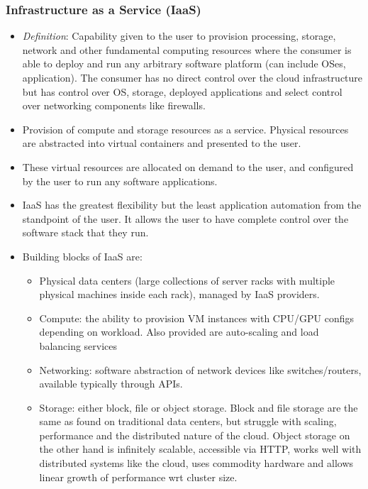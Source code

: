 \documentclass{article}
\begin{document}
\subsubsection{Infrastructure as a Service (IaaS)}
\begin{itemize}
    \item \textit{Definition}: Capability given to the user to provision processing, storage, network and other fundamental computing resources where the consumer is able to deploy and run any arbitrary software platform (can include OSes, application). The consumer has no direct control over the cloud infrastructure but has control over OS, storage, deployed applications and select control over networking components like firewalls.
    
    \item Provision of compute and storage resources as a service. Physical resources are abstracted into virtual containers and presented to the user. 
    
    \item These virtual resources are allocated on demand to the user, and configured by the user to run any software applications. 
    
    \item IaaS has the greatest flexibility but the least application automation from the standpoint of the user. It allows the user to have complete control over the software stack that they run.
    
    \item Building blocks of IaaS are:
    \begin{itemize}
        \item Physical data centers (large collections of server racks with multiple physical machines inside each rack), managed by IaaS providers.
        
        \item Compute: the ability to provision VM instances with CPU/GPU configs depending on workload. Also provided are auto-scaling and load balancing services
        
        \item Networking: software abstraction of network devices like switches/routers, available typically through APIs.
        
        \item Storage: either block, file or object storage. Block and file storage are the same as found on traditional data centers, but struggle with scaling, performance and the distributed nature of the cloud. Object storage on the other hand is infinitely scalable, accessible via HTTP, works well with distributed systems like the cloud, uses commodity hardware and allows linear growth of performance wrt cluster size.
    \end{itemize}
    

\end{itemize}
\end{document}
